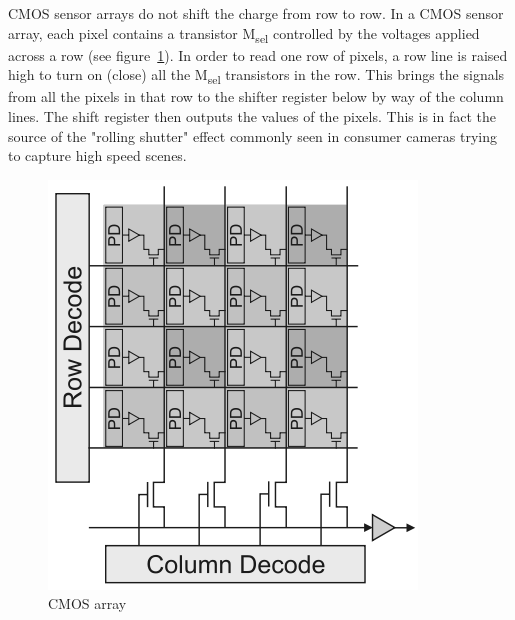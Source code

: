 CMOS sensor arrays do not shift the charge from row to row.
%
In a CMOS sensor array, each pixel contains a transistor M\textsubscript{sel} controlled by the voltages applied across a row (see figure~\ref{fig:cmosarray}).
%
In order to read one row of pixels, a row line is raised high to turn on (close) all the M\textsubscript{sel} transistors in the row.
%
This brings the signals from all the pixels in that row to the shifter register below by way of the column lines.
%
The shift register then outputs the values of the pixels.
%
This is in fact the source of the "rolling shutter" effect commonly seen in consumer cameras trying to capture high speed scenes.
\begin{figure}
    \center
    \includegraphics[width=.6\linewidth,keepaspectratio]{figures/cmod.png}
    \caption{CMOS array}
    \label{fig:cmosarray}
\end{figure}


